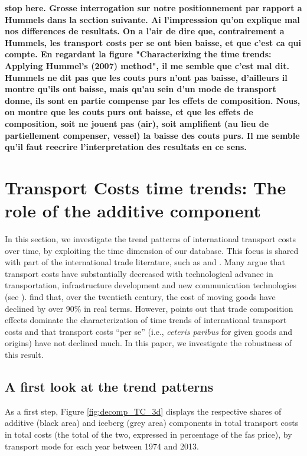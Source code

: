 \documentclass[a4paper,11pt]{article}
\begin{document}
\textbf{stop here. Grosse interrogation sur notre positionnement par rapport a Hummels dans la section suivante. Ai l'impresssion qu'on explique mal nos differences de resultats. On a l'air de dire que, contrairement a Hummels, les transport costs per se ont bien baisse, et que c'est ca qui compte. En regardant la figure "Characterizing the time trends: Applying Hummel's (2007) method", il me semble que c'est mal dit. Hummels ne dit pas que les couts purs n'ont pas baisse, d'ailleurs il montre qu'ils ont baisse, mais qu'au sein d'un mode de transport donne, ils sont en partie compense par les effets de composition. Nous, on montre que les couts purs ont baisse, et que les effets de composition, soit ne jouent pas (air), soit amplifient (au lieu de partiellement compenser, vessel) la baisse des couts purs. Il me semble qu'il faut reecrire l'interpretation des resultats en ce sens.}


\section{Transport Costs time trends: The role of the additive component}\label{sec:results_trends}

In this section, we investigate the trend patterns of international transport costs over time, by exploiting the time dimension of our database. This focus is shared with part of the international trade literature, such as \cite{hummels2007} and \cite{Behar_Venables}. Many argue that transport costs have substantially decreased with technological advance in transportation, infrastructure development and new communication technologies (see \citealp{Lafourcade_Thisse}). \cite{Glaeser04} find that, over the twentieth century, the cost of moving goods have declined by over 90\% in real terms. However, \cite{hummels2007} points out that trade composition effects dominate the characterization of time trends of international transport costs and that transport costs ``per se'' (i.e., \textit{ceteris paribus} for given goods and origins) have not declined much. In this paper, we investigate the robustness of this result.

\subsection{A first look at the trend patterns}

As a first step, Figure \ref{fig:decomp_TC_3d} displays the respective shares of additive (black area) and iceberg (grey area) components in total transport costs in total costs (the total of the two, expressed in percentage of the fas price), by transport mode for each year between 1974 and 2013.
\end{document}
